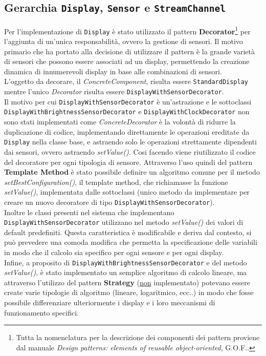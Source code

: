 \documentclass[a4paper,11pt]{article}
\begin{document}
	\subsection{Gerarchia \texttt{Display}, \texttt{Sensor} e \texttt{StreamChannel}}
	Per l'implementazione di \texttt{Display} è stato utilizzato il pattern \textbf{Decorator}\footnote{Tutta la nomenclatura per la descrizione dei componenti dei pattern proviene dal manuale \textit{Design patterns: elements of reusable object-oriented}, {\selectfont G.O.F.}.} per l'aggiunta di un'unica responsabilità, ovvero la gestione di sensori. Il motivo primario che ha portato alla decisione di utilizzare il pattern è la grande varietà di sensori che possono essere associati ad un display, permettendo la creazione dinamica di innumerevoli display in base alle combinazioni di sensori.\\
	L'oggetto da decorare, il \textit{ConcreteComponent}, risulta essere \texttt{StandardDisplay} mentre l'unico \textit{Decorator} risulta essere \texttt{DisplayWithSensorDecorator}.\\
	Il motivo per cui \texttt{DisplayWithSensorDecorator} è un'astrazione e le sottoclassi \texttt{DisplayWithBrightnessSensorDecorator} e \texttt{DisplayWithClockDecorator} non sono stati implementati come \textit{ConcreteDecorator} è la volontà di ridurre la duplicazione di codice, implementando direttamente le operazioni ereditate da \texttt{Display} nella classe base, e astraendo solo le operazioni strettamente dipendenti dai sensori, ovvero astraendo \textit{setValue()}. Cosi facendo viene riutilizzato il codice del decoratore per ogni tipologia di sensore. Attraverso l'uso quindi del pattern \textbf{Template Method} è stato possibile definire un algoritmo comune per il metodo \textit{setBestConfiguration()}, il template method, che richiamasse la funzione \textit{setValue()}, implementata dalle sottoclassi (unico metodo da implementare per creare un nuovo decoratore di tipo \texttt{DisplayWithSensorDecorator}).\\
	Inoltre le classi presenti nel sistema che implementano \texttt{DisplayWithSensorDecorator} utilizzano nel metodo \textit{setValue()} dei valori di default predefiniti. Questa caratteristica è modificabile e deriva dal contesto, si può prevedere una comoda modifica che permetta la specificazione delle variabili in modo che il calcolo sia specifico per ogni sensore e per ogni display.\\
	Infine, a proposito di \texttt{DisplayWithBrightnessSensorDecorator} e del metodo \textit{setValue()}, è stato implementato un semplice algoritmo di calcolo lineare, ma attraverso l'utilizzo del pattern \textbf{Strategy} (\underline{non} implementato) potevano essere create varie tipologie di algoritmo (lineare, logaritmico, ecc..) in modo che fosse possibile differenziare ulteriormente i display e i loro meccanismi di funzionamento specifici.\\
\end{document}
